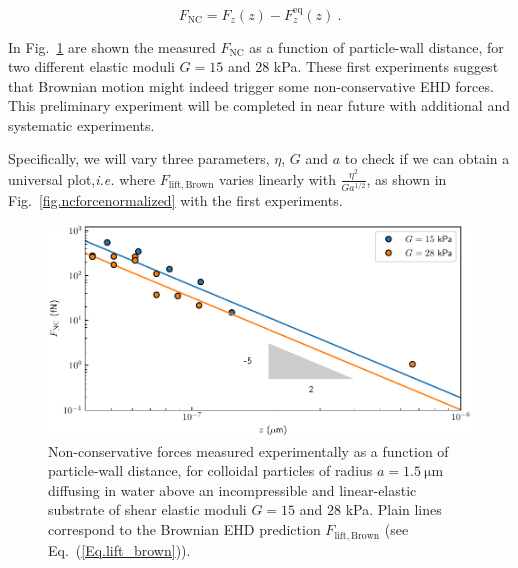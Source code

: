 \begin{equation}
	F_\mathrm{NC} = F_z(z) - F_z ^\mathrm{eq}(z) ~.
\end{equation}

In Fig.~\ref{fig.ncforce} are shown the measured $F_\mathrm{NC}$ as a function of particle-wall distance, for two different elastic moduli $G=15$ and $28$ kPa. These first experiments suggest that Brownian motion might indeed trigger some non-conservative \gls{EHD} forces. This preliminary experiment will be completed in near future with additional and systematic experiments.

Specifically, we will vary three parameters, $\eta$, $G$ and $a$ to check if we can obtain a universal plot,\textit{i.e.} where $F_\mathrm{lift, Brown}$ varies linearly with $\frac{\eta^2}{Ga^{1/2}} $, as shown in Fig.~\ref{fig.ncforcenormalized} with the first experiments.

\begin{figure}[H]
	\centering
	\includegraphics{02_body/chapter4/images/EHD_forces/EHD_force.pdf}
	\caption{Non-conservative forces measured experimentally as a function of particle-wall distance, for colloidal particles of radius $a=1.5 ~\mathrm{\mu m}$ diffusing in water above an incompressible and linear-elastic substrate of shear elastic moduli $G=15$ and $28$ kPa. Plain lines correspond to the Brownian \gls{EHD} prediction $F_\mathrm{lift, Brown}$ (see Eq.~(\ref{Eq.lift_brown})).~\href{https://github.com/eXpensia/Confined-Brownian-Motion/blob/main/02_body/chapter4/images/EHD_forces/global_EHD_plot.ipynb}{\faGithub}}
	\label{fig.ncforce}
\end{figure}

